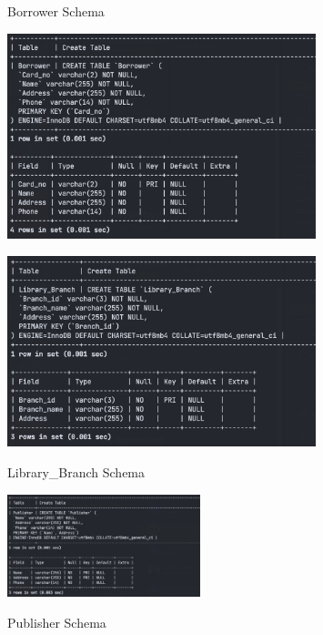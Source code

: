 \documentclass{article}
\begin{document}
\newpage
\begin{figure}[h!]
    \begin{minipage}[b]{0.5\linewidth}
        \centering
        \caption{Borrower Schema}
        \includegraphics[width=0.8\textwidth]{images/schema-table-borrower.png}
        \label{fig:schema-borrower}
    \end{minipage}
    \hspace{0.5cm}
    \begin{minipage}[b]{0.5\linewidth}
        \centering
        \caption{Library\_Branch Schema}
        \includegraphics[width=0.8\textwidth]{images/schema-table-library-branch.png}
        \label{fig:schema-library-branch}
    \end{minipage}
\end{figure}

\begin{figure}[h!]
    \centering
    \caption{Publisher Schema}
    \includegraphics[width=0.5\textwidth]{images/schema-table-publisher.png}
    \label{fig:schema-publisher}
\end{figure}
\end{document}
